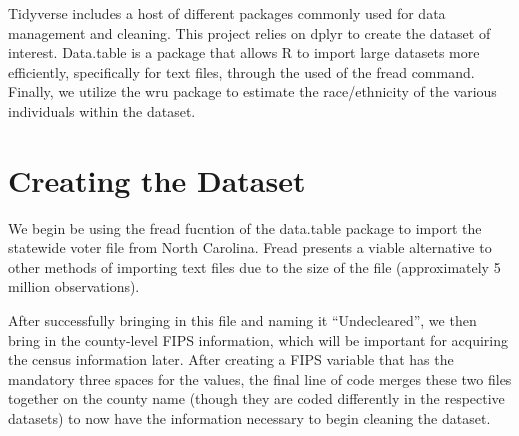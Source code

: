 \documentclass[
]{article}
\newenvironment{Shaded}{}{}
\newcommand{\AttributeTok}[1]{#1}
\newcommand{\DecValTok}[1]{#1}
\newcommand{\FunctionTok}[1]{#1}
\newcommand{\NormalTok}[1]{#1}
\newcommand{\OtherTok}[1]{\textcolor[rgb]{1.00,0.25,0.00}{#1}}
\newcommand{\SpecialCharTok}[1]{\textcolor[rgb]{0.00,0.50,0.50}{#1}}
\newcommand{\StringTok}[1]{\textcolor[rgb]{0.00,0.50,0.50}{#1}}
\begin{document}
Tidyverse includes a host of different packages commonly used for data
management and cleaning. This project relies on dplyr to create the
dataset of interest. Data.table is a package that allows R to import
large datasets more efficiently, specifically for text files, through
the used of the fread command. Finally, we utilize the wru package to
estimate the race/ethnicity of the various individuals within the
dataset.

\hypertarget{creating-the-dataset}{%
\section{Creating the Dataset}\label{creating-the-dataset}}

We begin be using the fread fucntion of the data.table package to import
the statewide voter file from North Carolina. Fread presents a viable
alternative to other methods of importing text files due to the size of
the file (approximately 5 million observations).

\begin{Shaded}
\end{Shaded}

After successfully bringing in this file and naming it ``Undecleared'',
we then bring in the county-level FIPS information, which will be
important for acquiring the census information later. After creating a
FIPS variable that has the mandatory three spaces for the values, the
final line of code merges these two files together on the county name
(though they are coded differently in the respective datasets) to now
have the information necessary to begin cleaning the dataset.
\end{document}
